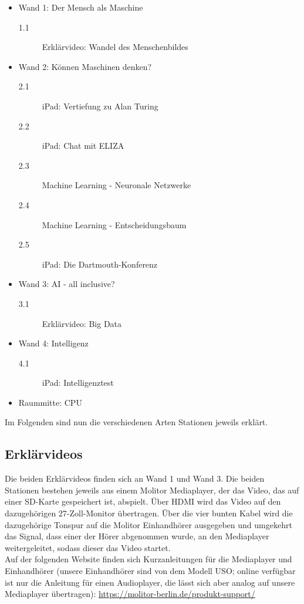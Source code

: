 \documentclass [titlepage,a4paper]{article}
\begin{document}
\begin{itemize}
    \item Wand 1: Der Mensch als Maschine
        \begin{description}
            \item[1.1] Erklärvideo: Wandel des Menschenbildes
        \end{description}

    \item Wand 2: Können Maschinen denken?
        \begin{description}
            \item[2.1] iPad: Vertiefung zu Alan Turing
            \item[2.2] iPad: Chat mit ELIZA
            \item[2.3] Machine Learning - Neuronale Netzwerke
            \item[2.4] Machine Learning - Entscheidungsbaum
            \item[2.5] iPad: Die Dartmouth-Konferenz
        \end{description}

    \item Wand 3: AI - all inclusive?
        \begin{description}
            \item[3.1] Erklärvideo: Big Data 
        \end{description}

    \item Wand 4: Intelligenz
        \begin{description}
            \item[4.1] iPad: Intelligenztest
        \end{description}

    \item Raummitte: CPU
\end{itemize}

Im Folgenden sind nun die verschiedenen Arten Stationen jeweils erklärt. 

\subsection{Erklärvideos}

Die beiden Erklärvideos finden sich an Wand 1 und Wand 3. Die beiden Stationen bestehen jeweils aus einem Molitor Mediaplayer, der das Video, das auf einer SD-Karte gespeichert ist, abspielt. Über HDMI wird das Video auf den dazugehörigen 27-Zoll-Monitor übertragen. Über die vier bunten Kabel wird die dazugehörige Tonspur auf die Molitor Einhandhörer ausgegeben und umgekehrt das Signal, dass einer der Hörer abgenommen wurde, an den Mediaplayer weitergeleitet, sodass dieser das Video startet. \\
Auf der folgenden Website finden sich Kurzanleitungen für die Mediaplayer und Einhandhörer (unsere Einhandhörer sind von dem Modell USO; online verfügbar ist nur die Anleitung für einen Audioplayer, die lässt sich aber analog auf unsere Mediaplayer übertragen): \href{https://molitor-berlin.de/produkt-support/ }{https://molitor-berlin.de/produkt-support/}
\end{document}
